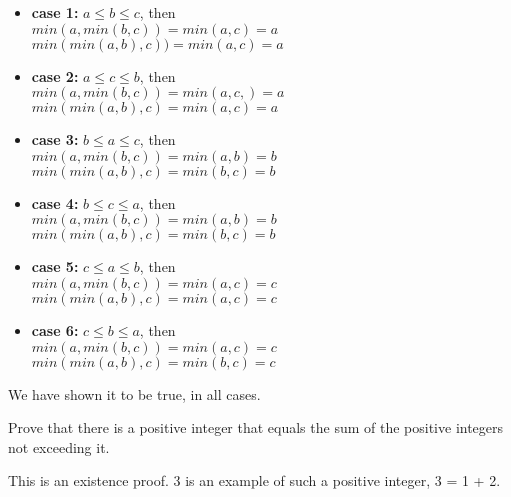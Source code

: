\begin{questions}
\begin{solution}
    \begin{minipage}{0.5\textwidth}
    \begin{itemize}[itemsep=1pt, topsep=0pt]
      \item \textbf{case 1:} $a \leq b \leq c$, then \\
        $min(a, min(b,c)) = min(a,c) = a$ \\
        $min(min(a,b),c)) = min(a,c) = a$ 
      \item \textbf{case 2:} $a \leq c \leq b$, then \\
        $min(a, min(b,c)) = min(a,c,) = a$ \\
        $min(min(a,b),c) = min(a,c) = a$ 
      \item \textbf{case 3:} $b \leq a \leq c$, then \\
        $min(a, min(b,c)) = min(a,b) = b$\\
        $min(min(a,b),c) = min(b,c) = b$ 
    \end{itemize}
    \end{minipage}
    \begin{minipage}{0.5\textwidth}
    \begin{itemize}[itemsep=1pt, topsep=0pt]
      \item \textbf{case 4:} $b \leq c \leq a$, then \\
        $min(a, min(b,c)) = min(a,b) = b$ \\
        $min(min(a,b),c) = min(b,c) = b$ 
      \item \textbf{case 5:} $c \leq a \leq b$, then \\
        $min(a, min(b,c)) = min(a,c) = c$\\
        $min(min(a,b),c) = min(a,c) = c$ 
      \item \textbf{case 6:} $c \leq b \leq a$, then \\
        $min(a, min(b,c)) = min(a,c) = c$ \\
        $min(min(a,b),c) = min(b,c) = c$ 
    \end{itemize}
    \end{minipage}

    \smallskip
    We have shown it to be true, in all cases.
\end{solution}


\vspace{-4pt}
 Prove that there is a positive integer that equals the
sum of the positive integers not exceeding it.
    \ifprintanswers
        \vspace{-12pt}
    \fi
\begin{solution}
    This is an existence proof.  3 is an example of such a positive
    integer, 3 = 1 + 2.
\end{solution}


\end{questions}
